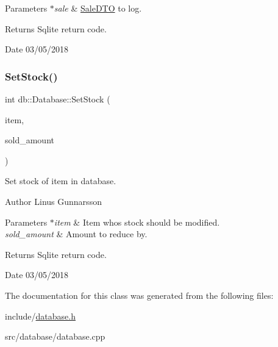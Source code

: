 \begin{DoxyParams}{Parameters}
{\em $\ast$sale} & \mbox{\hyperlink{classdb_1_1SaleDTO}{Sale\+D\+TO}} to log. \\
\hline
\end{DoxyParams}
\begin{DoxyReturn}{Returns}
Sqlite return code. 
\end{DoxyReturn}
\begin{DoxyDate}{Date}
03/05/2018 
\end{DoxyDate}
\mbox{\label{classdb_1_1Database_a777611636e84a82dc2bbd2be10491bb7}} 
\subsubsection{\texorpdfstring{Set\+Stock()}{SetStock()}}
{\footnotesize\ttfamily int db\+::\+Database\+::\+Set\+Stock (\begin{DoxyParamCaption}\item[{const \mbox{\hyperlink{classdb_1_1ItemDTO}{Item\+D\+TO}} $\ast$}]{item,  }\item[{int}]{sold\+\_\+amount }\end{DoxyParamCaption})}

Set stock of item in database. \begin{DoxyAuthor}{Author}
Linus Gunnarsson 
\end{DoxyAuthor}

\begin{DoxyParams}{Parameters}
{\em $\ast$item} & Item whos stock should be modified. \\
\hline
{\em sold\+\_\+amount} & Amount to reduce by. \\
\hline
\end{DoxyParams}
\begin{DoxyReturn}{Returns}
Sqlite return code. 
\end{DoxyReturn}
\begin{DoxyDate}{Date}
03/05/2018 
\end{DoxyDate}


The documentation for this class was generated from the following files\+:\begin{DoxyCompactItemize}
\item 
include/\mbox{\hyperlink{database_8h}{database.\+h}}\item 
src/database/database.\+cpp\end{DoxyCompactItemize}
